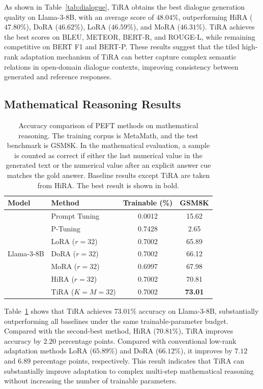 \documentclass[a4paper,11pt]{article}
\begin{document}
As shown in Table~\ref{tab:dialogue}, TiRA obtains the best dialogue generation quality on Llama-3-8B, with an average score of $48.04\%$, outperforming HiRA ($47.80\%$), DoRA ($46.62\%$), LoRA ($46.59\%$), and MoRA ($46.31\%$). TiRA achieves the best scores on BLEU, METEOR, BERT-R, and ROUGE-L, while remaining competitive on BERT F1 and BERT-P. These results suggest that the tiled high-rank adaptation mechanism of TiRA can better capture complex semantic relations in open-domain dialogue contexts, improving consistency between generated and reference responses.

\subsection{Mathematical Reasoning Results}

\begin{table}[H]
\centering
\caption{Accuracy comparison of PEFT methods on mathematical reasoning. The training corpus is MetaMath, and the test benchmark is GSM8K. In the mathematical evaluation, a sample is counted as correct if either the last numerical value in the generated text or the numerical value after an explicit answer cue matches the gold answer. Baseline results except TiRA are taken from HiRA. The best result is shown in bold.}
\label{tab:math}
\begin{tabular}{llcc}
\toprule
Model & Method & Trainable (\%) & GSM8K \\
\midrule
\multirow{7}{*}{Llama-3-8B}
& Prompt Tuning & 0.0012 & 15.62 \\
& P-Tuning & 0.7428 & 2.65 \\
& LoRA ($r=32$) & 0.7002 & 65.89 \\
& DoRA ($r=32$) & 0.7002 & 66.12 \\
& MoRA ($r=32$) & 0.6997 & 67.98 \\
& HiRA ($r=32$) & 0.7002 & 70.81 \\
& TiRA ($K=M=32$) & 0.7002 & \textbf{73.01} \\
\bottomrule
\end{tabular}
\end{table}

Table~\ref{tab:math} shows that TiRA achieves $73.01\%$ accuracy on Llama-3-8B, substantially outperforming all baselines under the same trainable-parameter budget. Compared with the second-best method, HiRA ($70.81\%$), TiRA improves accuracy by $2.20$ percentage points. Compared with conventional low-rank adaptation methods LoRA ($65.89\%$) and DoRA ($66.12\%$), it improves by $7.12$ and $6.89$ percentage points, respectively. This result indicates that TiRA can substantially improve adaptation to complex multi-step mathematical reasoning without increasing the number of trainable parameters.
\end{document}
